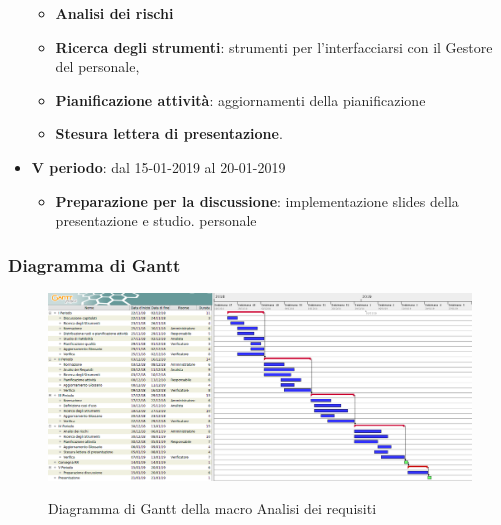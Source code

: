 \begin{itemize}
        	\begin{itemize}
    	        \item \textbf{Analisi dei rischi}
       	        \item \textbf{Ricerca degli strumenti}: strumenti per l'interfacciarsi con il Gestore del personale, 
       	        \item \textbf{Pianificazione attività}: aggiornamenti della pianificazione
       	        \item \textbf{Stesura lettera di presentazione}.
        	\end{itemize}
        	\item \textbf{V periodo}: dal 15-01-2019 al 20-01-2019
        	\begin{itemize}
    	        \item \textbf{Preparazione per la discussione}: implementazione slides della presentazione e studio. personale
        	\end{itemize}
		\end{itemize}
		
        \begin{landscape}
			\subsubsection{Diagramma di Gantt}        
			\begin{figure}[H]
					\centering
					\includegraphics[scale=0.425]{img/Analisi_dei_Requisiti.png}\\
					\caption{Diagramma di Gantt della macro Analisi dei requisiti}
			\end{figure}
		\end{landscape}
		\newpage
